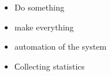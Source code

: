 \documentclass[10pt,a4paper]{altacv}
\begin{document}

\begin{itemize}
\item Do something
\end{itemize}
  
\divider

\begin{itemize}
\item make everything
\end{itemize}
\divider

\begin{itemize}
\item automation of the system
\item Сollecting statistics
\end{itemize}
  


\medskip



\clearpage







\end{document}
